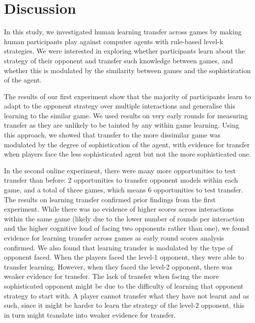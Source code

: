 \documentclass[man,floatsintext]{apa6}
\begin{document}
\newpage

\hypertarget{discussion}{%
\section{Discussion}\label{discussion}}

In this study, we investigated human learning transfer across games by making human participants play against computer agents with rule-based level-k strategies. We were interested in exploring whether participants learn about the strategy of their opponent and transfer such knowledge between games, and whether this is modulated by the similarity between games and the sophistication of the agent.

The results of our first experiment show that the majority of participants learn to adapt to the opponent strategy over multiple interactions and generalise this learning to the similar game. We used results on very early rounds for measuring transfer as they are unlikely to be tainted by any within game learning. Using this approach, we showed that transfer to the more dissimilar game was modulated by the degree of sophistication of the agent, with evidence for transfer when players face the less sophisticated agent but not the more sophisticated one.

In the second online experiment, there were many more opportunities to test transfer than before: 2 opportunities to transfer opponent models within each game, and a total of three games, which means 6 opportunities to test transfer. The results on learning transfer confirmed prior findings from the first experiment. While there was no evidence of higher scores across interactions within the same game (likely due to the lower number of rounds per interaction and the higher cognitive load of facing two opponents rather than one), we found evidence for learning transfer across games as early round scores analysis confirmed. We also found that learning transfer is modulated by the type of opponent faced. When the players faced the level-1 opponent, they were able to transfer learning. However, when they faced the level-2 opponent, there was weaker evidence for transfer. The lack of transfer when facing the more sophisticated opponent might be due to the difficulty of learning that opponent strategy to start with. A player cannot transfer what they have not learnt and as such, since it might be harder to learn the strategy of the level-2 opponent, this in turn might translate into weaker evidence for transfer.
\end{document}
